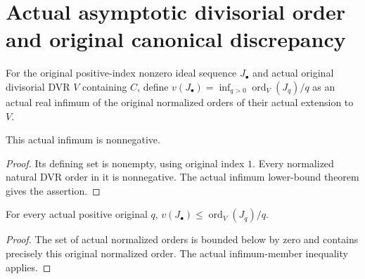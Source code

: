 \section{Actual asymptotic divisorial order and original canonical discrepancy}

\begin{definition}\label{def:sc0-original-asymptotic-divisorial-order}
\leanok
For the original positive-index nonzero ideal sequence $J_\bullet$
and actual original divisorial DVR $V$ containing $C$, define
$v(J_\bullet)=\inf_{q>0}\operatorname{ord}_V(J_q)/q$ as an actual
real infimum of the original normalized orders of their actual
extension to $V$.
\end{definition}

\begin{lemma}\label{lem:sc0-original-asymptotic-divisorial-order-nonneg}
\leanok
{}
This actual infimum is nonnegative.
\end{lemma}
\begin{proof}
Its defining set is nonempty, using original index $1$. Every
normalized natural DVR order in it is nonnegative. The actual
infimum lower-bound theorem gives the assertion.
\end{proof}

\begin{lemma}\label{lem:sc0-original-asymptotic-divisorial-order-le}
\leanok
{}
For every actual positive original $q$,
$v(J_\bullet)\le\operatorname{ord}_V(J_q)/q$.
\end{lemma}
\begin{proof}
The set of actual normalized orders is bounded below by zero and
contains precisely this original normalized order. The actual
infimum-member inequality applies.
\end{proof}

